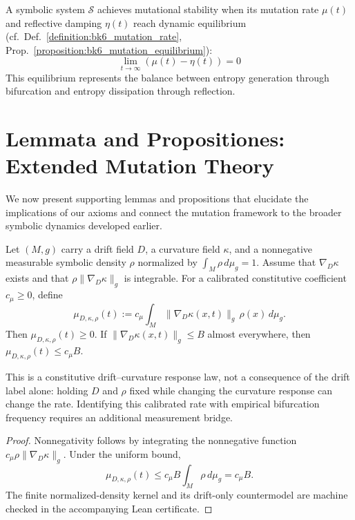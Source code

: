\begin{axiom}
\label{axiom:bk6_equilibrium_of_mutability}
A symbolic system $\mathcal{S}$ achieves mutational stability when its mutation rate $\mu(t)$ and reflective damping $\eta(t)$ reach dynamic equilibrium (cf.~Def.~\ref{definition:bk6_mutation_rate}, Prop.~\ref{proposition:bk6_mutation_equilibrium}):
\begin{equation}
\lim_{t \to \infty} (\mu(t) - \eta(t)) = 0
\end{equation}
This equilibrium represents the balance between entropy generation through bifurcation and entropy dissipation through reflection.
\end{axiom}
\section{Lemmata and Propositiones: Extended Mutation Theory}
\label{sec:bk6_lemmata_and_propositiones_extended_mutation_theory}
We now present supporting lemmas and propositions that elucidate the implications of our axioms and connect the mutation framework to the broader symbolic dynamics developed earlier.
\begin{lemma}
\label{lemma:bk6_symbolic_drift_mutation_relation}
Let $(M,g)$ carry a drift field $D$, a curvature field $\kappa$, and a
nonnegative measurable symbolic density $\rho$ normalized by
$\int_M\rho\,d\mu_g=1$. Assume that $\nabla_D\kappa$ exists and that
$\rho\|\nabla_D\kappa\|_g$ is integrable. For a calibrated constitutive
coefficient $c_\mu\geq0$, define
\[
 \mu_{D,\kappa,\rho}(t)
 :=c_\mu\int_M\|\nabla_D\kappa(x,t)\|_g\,\rho(x)\,d\mu_g.
\]
Then $\mu_{D,\kappa,\rho}(t)\geq0$. If
$\|\nabla_D\kappa(x,t)\|_g\leq B$ almost everywhere, then
$\mu_{D,\kappa,\rho}(t)\leq c_\mu B$.

This is a constitutive drift--curvature response law, not a consequence of the
drift label alone: holding $D$ and $\rho$ fixed while changing the curvature
response can change the rate. Identifying this calibrated rate with empirical
bifurcation frequency requires an additional measurement bridge.
\begin{proof}
\label{proof:bk6_symbolic_drift_mutation_relation}
Nonnegativity follows by integrating the nonnegative function
$c_\mu\rho\|\nabla_D\kappa\|_g$. Under the uniform bound,
\[
 \mu_{D,\kappa,\rho}(t)
 \leq c_\mu B\int_M\rho\,d\mu_g=c_\mu B.
\]
The finite normalized-density kernel and its drift-only countermodel are
machine checked in the accompanying Lean certificate.
\end{proof}
\end{lemma}
